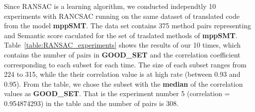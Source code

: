 %







Since RANSAC is a learning algorithm, we conducted independtly 10
experiments with RANCSAC running on the same dataset of translated
code from the model \textbf{mppSMT}. The data set contains 375 method
pairs representing {\model} and Semantic score caculated for the set
of traslated methods of
\textbf{mppSMT}. Table~\ref{table:RANSAC_experiments} shows the
results of our 10 times, which contains the number of pairs in
\textbf{GOOD\_SET} and the correlation coefficient corresponding to
each subset for each time.
%
The size of each subset ranges from 224 to 315, while the their
correlation value is at high rate (between 0.93 and 0.95).  From the
table, we chose the subset with the \textbf{median} of the correlation
values as \textbf{GOOD\_SET}. That is the experiment number 5
(correlation = 0.954874293) in the table and the number of pairs is
308.


